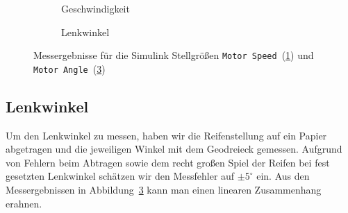 \begin{figure}
\begin{subfigure}{.5\textwidth}
	\centering
	
	\caption[Motor Speed]{Geschwindigkeit}
	\label{fig:motor_speed}
\end{subfigure}
\begin{subfigure}{.5\textwidth}
	\centering
	
	\caption[Motor Angle]{Lenkwinkel}
	\label{fig:motor_angle}
\end{subfigure}
\caption[Simulink Stellgrößen]{Messergebnisse für die Simulink Stellgrößen \texttt{Motor Speed}~(\ref{fig:motor_speed}) und \texttt{Motor Angle}~(\ref{fig:motor_angle})}
\end{figure}


\subsection{Lenkwinkel}

Um den Lenkwinkel zu messen, haben wir die Reifenstellung auf ein Papier abgetragen und die jeweiligen Winkel mit dem Geodreieck gemessen. Aufgrund von Fehlern beim Abtragen sowie dem recht großen Spiel der Reifen bei fest gesetzten Lenkwinkel schätzen wir den Messfehler auf $\pm5^\circ$ ein. Aus den Messergebnissen in Abbildung~\ref{fig:motor_angle} kann man einen linearen Zusammenhang erahnen.
